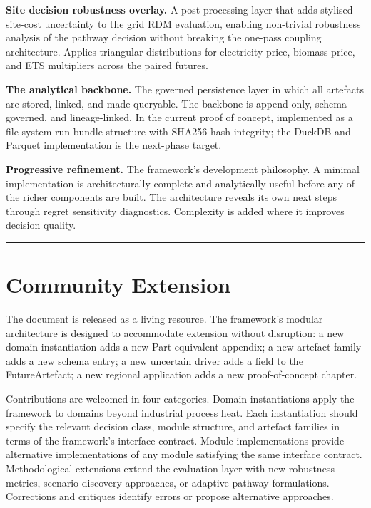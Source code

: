 \documentclass[
  11pt,
  a4paper,
  twoside,
  openright]{scrbook}
\begin{document}
\textbf{Site decision robustness overlay.} A post-processing layer that
adds stylised site-cost uncertainty to the grid RDM evaluation, enabling
non-trivial robustness analysis of the pathway decision without breaking
the one-pass coupling architecture. Applies triangular distributions for
electricity price, biomass price, and ETS multipliers across the paired
futures.

\textbf{The analytical backbone.} The governed persistence layer in
which all artefacts are stored, linked, and made queryable. The backbone
is append-only, schema-governed, and lineage-linked. In the current
proof of concept, implemented as a file-system run-bundle structure with
SHA256 hash integrity; the DuckDB and Parquet implementation is the
next-phase target.

\textbf{Progressive refinement.} The framework's development philosophy.
A minimal implementation is architecturally complete and analytically
useful before any of the richer components are built. The architecture
reveals its own next steps through regret sensitivity diagnostics.
Complexity is added where it improves decision quality.

\begin{center}\rule{0.5\linewidth}{0.5pt}\end{center}

\section{Community Extension}\label{community-extension}

The document is released as a living resource. The framework's modular
architecture is designed to accommodate extension without disruption: a
new domain instantiation adds a new Part-equivalent appendix; a new
artefact family adds a new schema entry; a new uncertain driver adds a
field to the FutureArtefact; a new regional application adds a new
proof-of-concept chapter.

Contributions are welcomed in four categories. Domain instantiations
apply the framework to domains beyond industrial process heat. Each
instantiation should specify the relevant decision class, module
structure, and artefact families in terms of the framework's interface
contract. Module implementations provide alternative implementations of
any module satisfying the same interface contract. Methodological
extensions extend the evaluation layer with new robustness metrics,
scenario discovery approaches, or adaptive pathway formulations.
Corrections and critiques identify errors or propose alternative
approaches.
\end{document}
